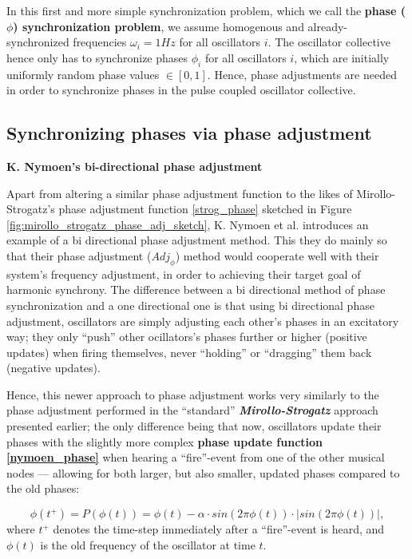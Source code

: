 	In this first and more simple synchronization problem, which we call the \textbf{phase ($\phi$) synchronization problem}, we assume homogenous and already-synchronized frequencies $\omega_i=1Hz$ for all oscillators $i$. The oscillator collective hence only has to synchronize phases $\phi_i$ for all oscillators $i$, which are initially uniformly random phase values $\in [0,1]$. Hence, phase adjustments are needed in order to synchronize phases in the pulse coupled oscillator collective.

	
	\subsection{Synchronizing phases via phase adjustment}

	\textbf{K. Nymoen's bi-directional phase adjustment} \nl %
	\label{subsec:nymoen_phase_adjust}

	Apart from altering a similar phase adjustment function to the likes of Mirollo-Strogatz's phase adjustment function \eqref{strog_phase} sketched in Figure \ref{fig:mirollo_strogatz_phase_adj_sketch}, K. Nymoen et al. \cite{nymoen_synch} introduces an example of a bi directional phase adjustment method. This they do mainly so that their phase adjustment ($Adj_{\phi}$) method would cooperate well with their system's frequency adjustment, in order to achieving their target goal of harmonic synchrony. The difference between a bi directional method of phase synchronization and a one directional one is that using bi directional phase adjustment, oscillators are simply adjusting each other's phases in an excitatory way; they only ``push'' other ocillators's phases further or higher (positive updates) when firing themselves, never ``holding'' or ``dragging'' them back (negative updates).

	Hence, this newer approach to phase adjustment works very similarly to the phase adjustment performed in the ``standard'' \textbf{\textit{Mirollo-Strogatz}} approach presented earlier; the only difference being that now, oscillators update their phases with the slightly more complex \textbf{phase update function \eqref{nymoen_phase}} when hearing a ``fire''-event from one of the other musical nodes — allowing for both larger, but also smaller, updated phases compared to the old phases:

	\begin{equation}
	\label{nymoen_phase}
		\phi(t^+)=P(\phi(t)) = \phi(t) - \alpha \cdot sin(2\pi\phi(t)) \cdot | sin(2\pi\phi(t)) | ,
	\end{equation} \nl
	where $t^+$ denotes the time-step immediately after a ``fire''-event is heard, and $\phi(t)$ is the old frequency of the oscillator at time $t$.

